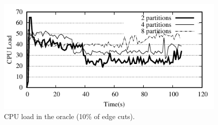 \begin{figure}[ht]
	\includegraphics[width=\columnwidth]{figures/socc/socc-oracle-load}
	\caption{CPU load in the oracle (10\% of edge cuts).}
	\label{fig:cpu_oracle}
\end{figure}

